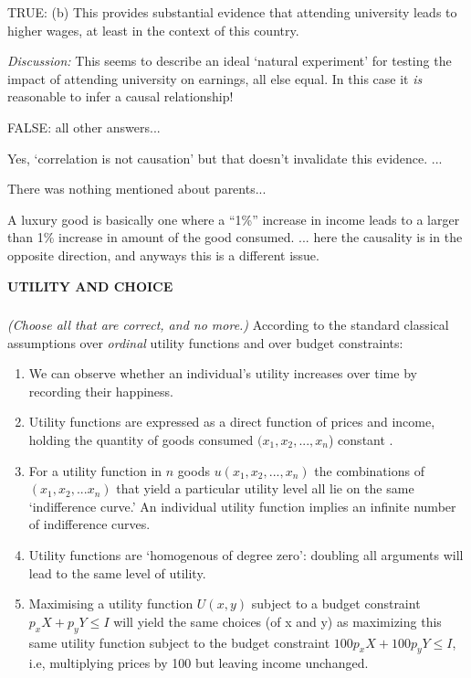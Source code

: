 \documentclass[]{article}
\begin{document}
TRUE: (b) This provides substantial evidence that attending university
leads to higher wages, at least in the context of this country.

\emph{Discussion:} This seems to describe an ideal `natural experiment'
for testing the impact of attending university on earnings, all else
equal. In this case it \emph{is} reasonable to infer a causal
relationship!

FALSE: all other answers...

Yes, `correlation is not causation' but that doesn't invalidate this
evidence. ...

There was nothing mentioned about parents...

A luxury good is basically one where a ``1\%'' increase in income leads
to a larger than 1\% increase in amount of the good consumed. ... here
the causality is in the opposite direction, and anyways this is a
different issue.

\textbf{UTILITY AND CHOICE}

\hypertarget{section-3}{%
\subsubsection{}\label{section-3}}

\emph{(Choose all that are correct, and no more.)} According to the
standard classical assumptions over \emph{ordinal} utility functions and
over budget constraints:

\begin{enumerate}
\def\labelenumi{\Alph{enumi}.}
\item
  We can observe whether an individual's utility increases over time by
  recording their happiness.
\item
  Utility functions are expressed as a direct function of prices and
  income, holding the quantity of goods consumed \((x_1,x_2,...,x_n\))
  constant .
\item
  For a utility function in \(n\) goods \(u(x_1,x_2,...,x_n)\) the
  combinations of \((x_1,x_2,...x_n)\) that yield a particular utility
  level all lie on the same `indifference curve.' An individual utility
  function implies an infinite number of indifference curves.
\item
  Utility functions are `homogenous of degree zero': doubling all
  arguments will lead to the same level of utility.
\item
  Maximising a utility function \(U(x,y)\) subject to a budget
  constraint \(p_xX + p_yY \leq I\) will yield the same choices (of x
  and y) as maximizing this same utility function subject to the budget
  constraint \(100p_xX + 100p_yY \leq I\), i.e, multiplying prices by
  100 but leaving income unchanged.
\end{enumerate}
\end{document}
